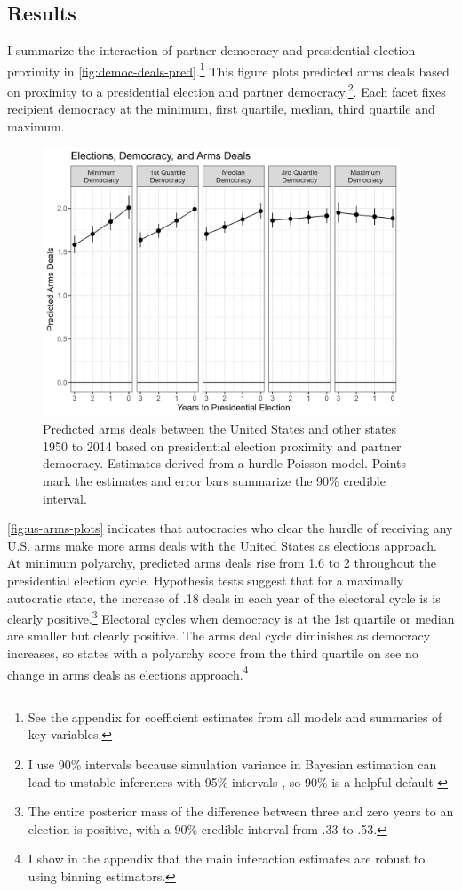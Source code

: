 \documentclass[12pt]{article}
\begin{document}
\subsection{Results}


I summarize the interaction of partner democracy and presidential election proximity in \autoref{fig:democ-deals-pred}.\footnote{See the appendix for coefficient estimates from all models and summaries of key variables.}
This figure plots predicted arms deals based on proximity to a presidential election and partner democracy.\footnote{I use 90\% intervals because simulation variance in Bayesian estimation can lead to unstable inferences with 95\% intervals \citep{McElreath2016}, so 90\% is a helpful default \citep{Goodrichetal2023}}.
Each facet fixes recipient democracy at the minimum, first quartile, median, third quartile and maximum.


\begin{figure}[htpb]
	\centering
		\includegraphics[width=0.95\textwidth]{../figures/democ-deals-pred.png}
	\caption{Predicted arms deals between the United States and other states 1950 to 2014 based on presidential election proximity and partner democracy. Estimates derived from a hurdle Poisson model. Points mark the estimates and error bars summarize the 90\% credible interval.}
	\label{fig:democ-deals-pred}
\end{figure}


\autoref{fig:us-arms-plots} indicates that autocracies who clear the hurdle of receiving any U.S. arms make more arms deals with the United States as elections approach.
At minimum polyarchy, predicted arms deals rise from 1.6 to 2 throughout the presidential election cycle.
Hypothesis tests suggest that for a maximally autocratic state, the increase of .18 deals in each year of the electoral cycle is is clearly positive.\footnote{The entire posterior mass of the difference between three and zero years to an election is positive, with a 90\% credible interval from .33 to .53.}
Electoral cycles when democracy is at the 1st quartile or median are smaller but clearly positive.
The arms deal cycle diminishes as democracy increases, so states with a polyarchy score from the third quartile on see no change in arms deals as elections approach.\footnote{I show in the appendix that the main interaction estimates are robust to using binning estimators.}  
\end{document}
